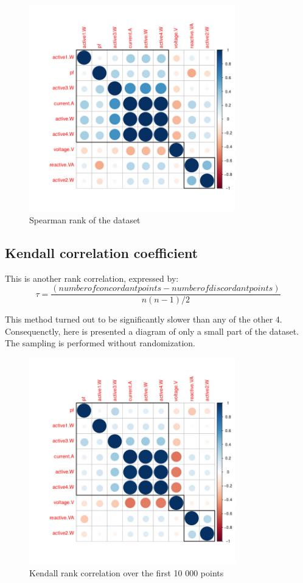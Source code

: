 \documentclass[11pt]{article}
\newcommand{\para}[0]{\par\vspace{0.5cm}}
\begin{document}
\begin{figure}[!htp]
  \centering
    \includegraphics[width=0.8\textwidth]{img/spearman}
    \caption{Spearman rank of the dataset}
\end{figure}

\subsection{Kendall correlation coefficient}
This is another rank correlation, expressed by\cite{q10}:
$$ \tau = \frac{({number of concordant points}-{number of discordant points})}
                 {n(n-1)/2} $$
\para
This method turned out to be significantly slower than any of the other 4.
Consequenctly, here is presented a diagram of only a small part of the dataset.
The sampling is performed without randomization.

\begin{figure}[!htp]
  \centering
    \includegraphics[width=0.8\textwidth]{img/kendall}
    \caption{Kendall rank correlation over the first 10 000 points}
\end{figure}
\end{document}
